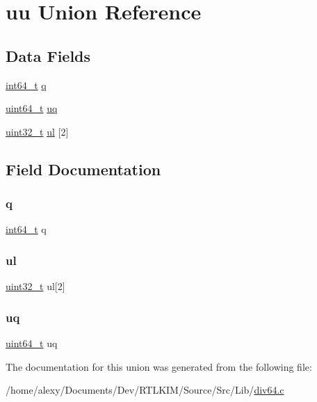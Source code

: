 \hypertarget{unionuu}{}\section{uu Union Reference}
\label{unionuu}
\subsection*{Data Fields}
\begin{DoxyCompactItemize}
\item 
\hyperlink{stdint_8h_adec1df1b8b51cb32b77e5b86fff46471}{int64\+\_\+t} \hyperlink{unionuu_ad74fa85f9b6a88306daa9ebe976ef8b2}{q}
\item 
\hyperlink{stdint_8h_aaa5d1cd013383c889537491c3cfd9aad}{uint64\+\_\+t} \hyperlink{unionuu_a6aa9e040abadf07b22eb1fc7f12e88af}{uq}
\item 
\hyperlink{stdint_8h_a324c5d28c0d82f502a234ab99efac87a}{uint32\+\_\+t} \hyperlink{unionuu_a8fbd1c640baef4d820de7b1841353243}{ul} \mbox{[}2\mbox{]}
\end{DoxyCompactItemize}


\subsection{Field Documentation}
\mbox{\label{unionuu_ad74fa85f9b6a88306daa9ebe976ef8b2}} 
\subsubsection{\texorpdfstring{q}{q}}
{\footnotesize\ttfamily \hyperlink{stdint_8h_adec1df1b8b51cb32b77e5b86fff46471}{int64\+\_\+t} q}

\mbox{\label{unionuu_a8fbd1c640baef4d820de7b1841353243}} 
\subsubsection{\texorpdfstring{ul}{ul}}
{\footnotesize\ttfamily \hyperlink{stdint_8h_a324c5d28c0d82f502a234ab99efac87a}{uint32\+\_\+t} ul\mbox{[}2\mbox{]}}

\mbox{\label{unionuu_a6aa9e040abadf07b22eb1fc7f12e88af}} 
\subsubsection{\texorpdfstring{uq}{uq}}
{\footnotesize\ttfamily \hyperlink{stdint_8h_aaa5d1cd013383c889537491c3cfd9aad}{uint64\+\_\+t} uq}



The documentation for this union was generated from the following file\+:\begin{DoxyCompactItemize}
\item 
/home/alexy/\+Documents/\+Dev/\+R\+T\+L\+K\+I\+M/\+Source/\+Src/\+Lib/\hyperlink{div64_8c}{div64.\+c}\end{DoxyCompactItemize}

